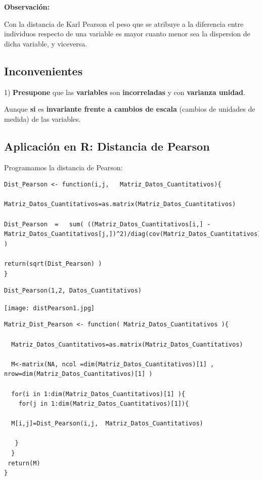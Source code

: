 \documentclass[12pt]{report} %
\begin{document}
\textbf{Observación:}

Con la distancia de Karl Pearson el peso que se atribuye a la diferencia entre individuos respecto de una variable es mayor cuanto menor sea la dispersion de dicha variable, y viceversa.

\subsection{Inconvenientes}

 
1) \hspace{0.15cm} \textbf{Presupone} que las \textbf{variables} son \textbf{incorreladas} y con \textbf{varianza unidad}. 

Aunque \textbf{si} es \textbf{invariante frente a cambios de escala} (cambios de unidades de medida) de las variables.

\newpage 

\subsection{Aplicación en R: Distancia de Pearson}

Programamos la distancia de Pearson:

\begin{lstlisting}
Dist_Pearson <- function(i,j,   Matriz_Datos_Cuantitativos){

Matriz_Datos_Cuantitativos=as.matrix(Matriz_Datos_Cuantitativos)  
  
Dist_Pearson  =   sum( ((Matriz_Datos_Cuantitativos[i,] - Matriz_Datos_Cuantitativos[j,])^2)/diag(cov(Matriz_Datos_Cuantitativos)) ) 
  
return(sqrt(Dist_Pearson) )
}
\end{lstlisting}


\begin{lstlisting}
Dist_Pearson(1,2, Datos_Cuantitativos)
\end{lstlisting}


\texttt{[image: distPearson1.jpg]}

\begin{lstlisting}
Matriz_Dist_Pearson <- function( Matriz_Datos_Cuantitativos ){
  
  Matriz_Datos_Cuantitativos=as.matrix(Matriz_Datos_Cuantitativos)
  
  M<-matrix(NA, ncol =dim(Matriz_Datos_Cuantitativos)[1] , nrow=dim(Matriz_Datos_Cuantitativos)[1] )
  
  for(i in 1:dim(Matriz_Datos_Cuantitativos)[1] ){
    for(j in 1:dim(Matriz_Datos_Cuantitativos)[1]){
    
  M[i,j]=Dist_Pearson(i,j,  Matriz_Datos_Cuantitativos)
  
   }
  }
 return(M)
}
\end{lstlisting}
\end{document}
